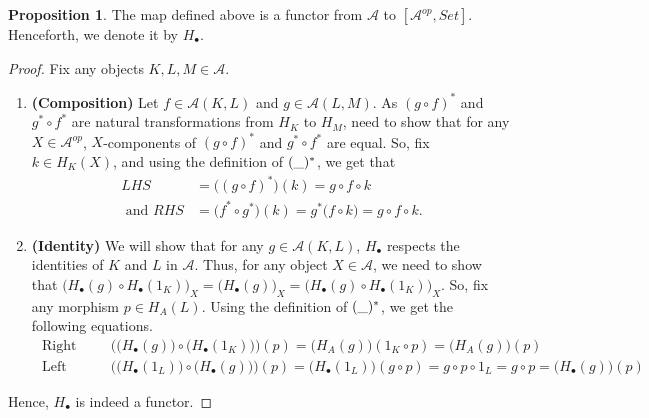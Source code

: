 \documentclass[18pt,a4paper]{article}
\theoremstyle{definition}
\newtheorem{proop}[theorem]{Proposition}
\begin{document}
\begin{proop} The map defined above is a functor from $\mathcal{A}$ to $[\mathcal{A} ^{op},Set]$.
	Henceforth, we denote it by $H_\bullet$.
\end{proop}
\begin{proof}\setcounter{equation}{0}
		Fix any objects $K,L,M \in \mathcal{A} $.
	\begin{enumerate}[label=\Roman*]
		\item \textbf{ (Composition) }
			Let $f \in \mathcal{A} (K,L)$ and $g \in \mathcal{A} (L,M)$.
			As $(g \circ f)^*$ and $g^* \circ f^* $ are natural transformations from
			$H_K$ to $H_M$, need to show that for any $X\in \mathcal{A} ^{op}$, $X$-components
			of $(g \circ f)^*$ and $g^* \circ f^* $ are equal. So, fix $k \in H_K(X)$,
			and using the definition of $(\string _)^*$, we get that
			\begin{align*}
				LHS&=\Big( (g \circ f)^* \Big) (k)=g\circ f \circ k \\
				\text{ and } RHS&=\Big( f^* \circ g^* \Big) (k)=g^* \big(f \circ k\big)
			=g\circ f \circ k. \end{align*}
\item \textbf{ (Identity) } We will show that for any $g \in \mathcal{A} (K,L)$, $H_\bullet$
	respects the identities	of $K$ and $L$ in $\mathcal{A}$.
	Thus, for any object $X \in \mathcal{A} $, we need to show that
	$\Big( H_\bullet(g) \circ H_\bullet(1_K) \Big)_X = \Big( H_\bullet(g)\Big) _X
	=\Big( H_\bullet(g) \circ H_\bullet(1_K) \Big)_X $. So, fix any morphism $p \in H_A(L)$.
	Using the definition of $(\string _)^*$, we get the following equations.
	\begin{align*}
		\text{ Right Identity: }& \Big( \big( H_\bullet(g) \big) \circ \big( H_\bullet(1_K)
		\big) \Big)(p)
		=\big( H_A(g) \big) (1_K \circ p) =
		\big( H_A(g) \big) (p) \\
		\text{ Left Identity: }& \Big( \big( H_\bullet(1_L) \big) \circ \big( H_\bullet(g)\big) \Big)(p)
		=\big( H_\bullet(1_L) \big) (g \circ p) = g \circ p \circ 1_L=g \circ p
		= \big( H_\bullet(g) \big)(p)
	\end{align*}

	\end{enumerate}
	Hence, $H_\bullet$ is indeed a functor.
\end{proof}
\end{document}
